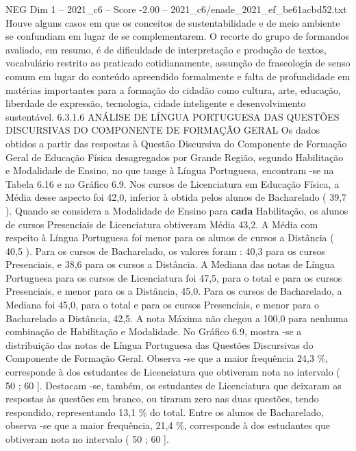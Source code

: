 \begin{textsample}{NEG Dim 1 – 2021\_c6 – Score -2.00 – 2021\_c6/enade\_2021\_ef\_be61acbd52.txt}
Houve alguns casos em que os conceitos de sustentabilidade e de meio ambiente se confundiam em lugar de se complementarem.
O recorte do grupo de formandos avaliado, em resumo, é de dificuldade de interpretação e produção de textos, vocabulário restrito ao praticado cotidianamente, assunção de fraseologia de senso comum em lugar do conteúdo apreendido formalmente e falta de profundidade em matérias importantes para a formação do cidadão como cultura, arte, educação, liberdade de expressão, tecnologia, cidade inteligente e desenvolvimento sustentável. 6.3.1.6 ANÁLISE DE LÍNGUA PORTUGUESA DAS QUESTÕES DISCURSIVAS DO COMPONENTE DE FORMAÇÃO GERAL Os dados obtidos a partir das respostas à Questão Discursiva do Componente de Formação Geral de Educação Física desagregados por Grande Região, segundo Habilitação e Modalidade de Ensino, no que tange à Língua Portuguesa, encontram -se na Tabela 6.16 e no Gráfico 6.9.
Nos cursos de Licenciatura em Educação Física, a Média desse aspecto foi 42,0, inferior à obtida pelos alunos de Bacharelado ( 39,7 ).
Quando se considera a Modalidade de Ensino para \textbf{cada} Habilitação, os alunos de cursos Presenciais de Licenciatura obtiveram Média 43,2.
A Média com respeito à Língua Portuguesa foi menor para os alunos de cursos a Distância ( 40,5 ).
Para os cursos de Bacharelado, os valores foram : 40,3 para os cursos Presenciais, e 38,6 para os cursos a Distância.
A Mediana das notas de Língua Portuguesa para os cursos de Licenciatura foi 47,5, para o total e para os cursos Presenciais, e menor para os a Distância, 45,0.
Para os cursos de Bacharelado, a Mediana foi 45,0, para o total e para os cursos Presenciais, e menor para o Bacharelado a Distância, 42,5.
A nota Máxima não chegou a 100,0 para nenhuma combinação de Habilitação e Modalidade.
No Gráfico 6.9, mostra -se a distribuição das notas de Língua Portuguesa das Questões Discursivas do Componente de Formação Geral.
Observa -se que a maior frequência 24,3 \%, corresponde à dos estudantes de Licenciatura que obtiveram nota no intervalo ( 50 ; 60 ].
Destacam -se, também, os estudantes de Licenciatura que deixaram as respostas às questões em branco, ou tiraram zero nas duas questões, tendo respondido, representando 13,1 \% do total.
Entre os alunos de Bacharelado, observa -se que a maior frequência, 21,4 \%, corresponde à dos estudantes que obtiveram nota no intervalo ( 50 ; 60 ].

\end{textsample}
